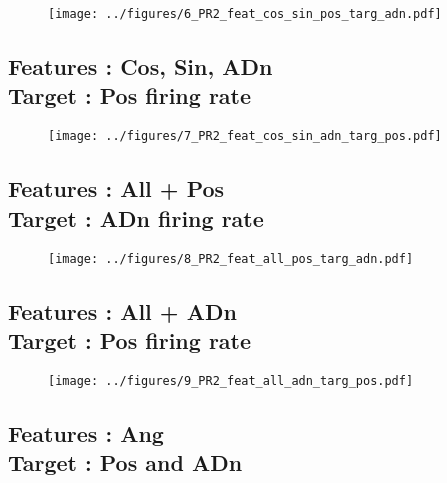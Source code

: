\documentclass[10pt,a4paper,twocolumn]{article}
\begin{document}
\begin{figure}[H]
	\begin{center}
		\texttt{[image: ../figures/6\_PR2\_feat\_cos\_sin\_pos\_targ\_adn.pdf]} 
	\end{center}
\end{figure}

\clearpage

\subsection{Features : Cos, Sin, ADn \\ Target : Pos firing rate}

\begin{figure}[H]
	\begin{center}
		\texttt{[image: ../figures/7\_PR2\_feat\_cos\_sin\_adn\_targ\_pos.pdf]} 
	\end{center}
\end{figure}

\subsection{Features : All + Pos \\ Target : ADn firing rate}

\begin{figure}[H]
	\begin{center}
		\texttt{[image: ../figures/8\_PR2\_feat\_all\_pos\_targ\_adn.pdf]} 
	\end{center}
\end{figure}

\subsection{Features : All + ADn \\ Target : Pos firing rate}

\begin{figure}[H]
	\begin{center}
		\texttt{[image: ../figures/9\_PR2\_feat\_all\_adn\_targ\_pos.pdf]} 
	\end{center}
\end{figure}

\subsection{Features : Ang \\ Target : Pos and ADn}
\end{document}
